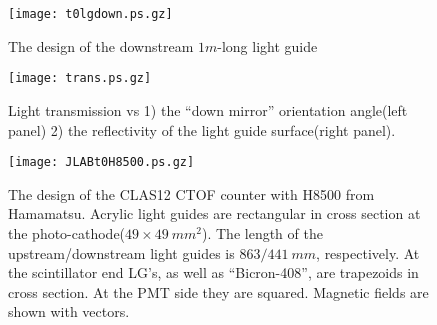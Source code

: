 
\clearpage
\newpage
\begin{figure}[htbp]%
\begin{center}
\texttt{[image: t0lgdown.ps.gz]}
\end{center}
\caption{%
The design of the downstream   $1m$-long light guide}
\label{lgdownstream}
\end{figure}
\clearpage


\begin{figure}[htbp]%
\begin{center}
\texttt{[image: trans.ps.gz]}
\end{center}
\caption{%
Light transmission  vs 1) the ``down mirror'' orientation angle(left panel)
2) the reflectivity of the light guide surface(right panel).
\label{trans}}
\end{figure}
\clearpage

\begin{figure}[htbp]%
\begin{center}
\texttt{[image: JLABt0H8500.ps.gz]}
\end{center}
\caption{%
The design  of the CLAS12 CTOF counter with 
H8500 from Hamamatsu. Acrylic light guides are rectangular in 
cross section at the photo-cathode($49\times49~mm^2$). The length of
 the upstream/downstream light guides is $863/441~mm$, respectively.
At the scintillator end LG's, as well as  ``Bicron-408'', are 
 trapezoids in cross section. At the PMT side they are squared.
Magnetic fields are shown with vectors.
\label{JLABt0H8500}}
\end{figure}
\clearpage


